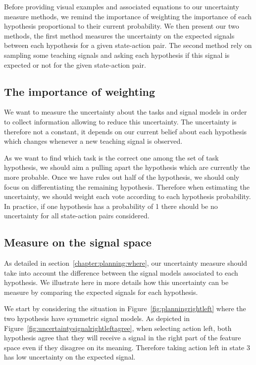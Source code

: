 Before providing visual examples and associated equations to our uncertainty measure methods, we remind the importance of weighting the importance of each hypothesis proportional to their current probability. We then present our two methods, the first method measures the uncertainty on the expected signals between each hypothesis for a given state-action pair. The second method rely on sampling some teaching signals and asking each hypothesis if this signal is expected or not for the given state-action pair.

\subsection{The importance of weighting}

We want to measure the uncertainty about the tasks and signal models in order to collect information allowing to reduce this uncertainty. The uncertainty is therefore not a constant, it depends on our current belief about each hypothesis which changes whenever a new teaching signal is observed.

As we want to find which task is the correct one among the set of task hypothesis, we should aim a pulling apart the hypothesis which are currently the more probable. Once we have rules out half of the hypothesis, we should only focus on differentiating the remaining hypothesis. Therefore when estimating the uncertainty, we should weight each vote according to each hypothesis probability. In practice, if one hypothesis has a probability of 1 there should be no uncertainty for all state-action pairs considered.

\subsection{Measure on the signal space}

As detailed in section~\ref{chapter:planning:where}, our uncertainty measure should take into account the difference between the signal models associated to each hypothesis. We illustrate here in more details how this uncertainty can be measure by comparing the expected signals for each hypothesis.

We start by considering the situation in Figure~\ref{fig:planningrightleft} where the two hypothesis have symmetric signal models. As depicted in Figure~\ref{fig:uncertaintysignalrightleftagree}, when selecting action left, both hypothesis agree that they will receive a signal in the right part of the feature space even if they disagree on its meaning. Therefore taking action left in state 3 has low uncertainty on the expected signal.

